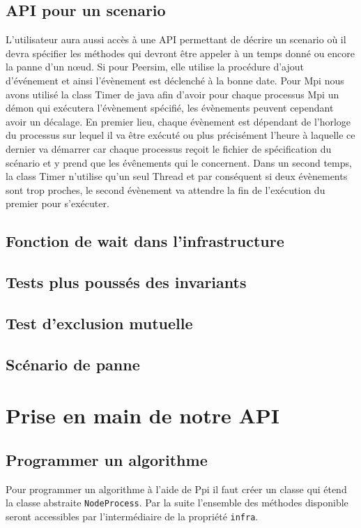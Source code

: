 \documentclass{article}
\begin{document}
			\subsection{API pour un scenario}
			L'utilisateur aura aussi accès à une API permettant de décrire un scenario où il devra spécifier les méthodes qui devront être appeler à un temps donné ou encore 
			la panne d'un nœud. 
			\newline
			Si pour Peersim, elle utilise la procédure d'ajout d'événement et ainsi l'évènement est déclenché à la bonne date.
			\newline
			Pour Mpi nous avons utilisé la class Timer de java afin d'avoir pour chaque processus Mpi un démon qui exécutera l'évènement spécifié, les évènements peuvent cependant avoir un décalage.
			\newline
			En premier lieu, chaque évènement est dépendant de l'horloge du processus sur lequel il va être exécuté ou plus précisément l'heure à laquelle ce dernier va démarrer car chaque processus reçoit le fichier de spécification du scénario et y prend que les évênements qui le concernent.
			\newline
			Dans un second temps, la class Timer n'utilise qu'un seul Thread et par conséquent si deux évènements sont trop proches, le second évènement va attendre la fin de l'exécution du premier pour s'exécuter.

			\subsection{Fonction de wait dans l'infrastructure}		
			\subsection{Tests plus poussés des invariants}
			\subsection{Test d'exclusion mutuelle}
			\subsection{Scénario de panne}
		
		\newpage
		\section{Prise en main de notre API}

		\subsection{Programmer un algorithme}
		Pour programmer un algorithme à l'aide de Ppi il faut créer un classe qui étend la classe abstraite \lstinline{NodeProcess}. Par la suite l'ensemble des méthodes disponible seront accessibles par l'intermédiaire de la propriété \lstinline{infra}.
\end{document}
